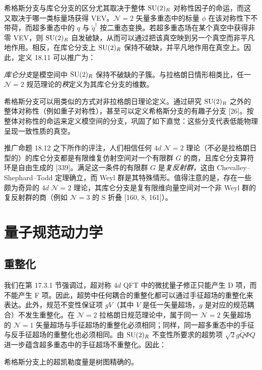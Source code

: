 希格斯分支与库仑分支的区分尤其取决于整体 $\operatorname{SU}(2)_R$ 对称性因子的命运，而这又取决于哪一类标量场获得 VEV。$\mathcal N=2$ 矢量多重态中的标量 $\phi$ 在该对称性下不带荷，而超多重态中的 $q$ 与 $\tilde q^\dagger$ 按二重态变换。若超多重态场在某个真空中获得非零 VEV，则 $\operatorname{SU}(2)_R$ 自发破缺，从而可以通过把该真空映到另一个真空而非平凡地作用。相反，在库仑分支上 $\operatorname{SU}(2)_R$ 保持不破缺，并平凡地作用在真空上。因此，定义 18.11 可以推广为：

\begin{definition}[18.17]
\emph{库仑分支}是模空间中 $\operatorname{SU}(2)_R$ 保持不破缺的子簇。与拉格朗日情形相类比，任一 $\mathcal N=2$ 规范理论的\emph{秩}定义为其库仑分支的维数。
\end{definition}

希格斯分支可以用类似的方式对非拉格朗日理论定义。通过研究 $\operatorname{SU}(2)_R$ 之外的整体对称性（例如重子对称性），甚至可以定义希格斯分支的有趣子分支 [26]。按整体对称性的命运来定义模空间的分支，巩固了如下直觉：这些分支代表低能物理呈现一致性质的真空。

推广命题 18.12 之下所作的评注，人们相信任何 $4d$ $\mathcal N=2$ 理论（不必是拉格朗日型的）的库仑分支都是有限维复仿射空间对一个有限群 $G$ 的商，且库仑分支算符环是自由生成的 [339]。满足这一条件的有限群 $G$ 是\emph{复反射群}，这由 Chevalley–Shephard–Todd 定理确立，而 Weyl 群是其特殊情形。值得注意的是，存在一些颇为奇异的 $4d$ $\mathcal N=2$ 理论，其库仑分支是复有限维向量空间对一个非 Weyl 群的复反射群的商（例如 $\mathcal N=3$ 的 S 折叠 [160, 8, 161]）。

\section{量子规范动力学}

\subsection{重整化}

我们在第 17.3.1 节强调过，超对称 $4d$ QFT 中的微扰量子修正只能产生 D 项，而不能产生 F 项。因此，超势中任何耦合的重整化都可以通过手征超场的重整化来表达。此外，规范不变性保证项 $gV$（其中 $V$ 是任一矢量超场，$g$ 是对应的规范耦合）不发生重整化。在 $\mathcal N=2$ 拉格朗日规范理论中，属于同一 $\mathcal N=2$ 矢量超场的 $\mathcal N=1$ 矢量超场与手征超场的重整化必须相同；同样，同一超多重态中的手征与反手征超场的重整化也必须相同。由 $\operatorname{SU}(2)_R$ 不变性所要求的超势项 $\sqrt{2}g\tilde Q\Phi Q$ 进一步蕴含超多重态中的手征超场不重整化。因此：

\begin{proposition}[18.18]
希格斯分支上的超凯勒度量是树图精确的。
\end{proposition}

